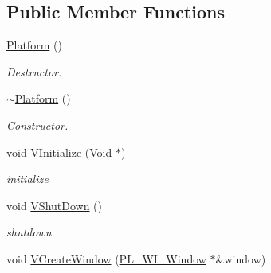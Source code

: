\subsection*{Public Member Functions}
\begin{DoxyCompactItemize}
\item 
\hypertarget{classPlatform_1_1Platform_1_1Linux_1_1Platform_abae694cf43dbc3e53f9f3312ed94dfcc}{
\hyperlink{classPlatform_1_1Platform_1_1Linux_1_1Platform_abae694cf43dbc3e53f9f3312ed94dfcc}{Platform} ()}
\label{classPlatform_1_1Platform_1_1Linux_1_1Platform_abae694cf43dbc3e53f9f3312ed94dfcc}

\begin{DoxyCompactList}\small\item\em Destructor. \item\end{DoxyCompactList}\item 
\hypertarget{classPlatform_1_1Platform_1_1Linux_1_1Platform_a2afa38efdbf00074c5a75e7be42998e5}{
\hyperlink{classPlatform_1_1Platform_1_1Linux_1_1Platform_a2afa38efdbf00074c5a75e7be42998e5}{$\sim$Platform} ()}
\label{classPlatform_1_1Platform_1_1Linux_1_1Platform_a2afa38efdbf00074c5a75e7be42998e5}

\begin{DoxyCompactList}\small\item\em Constructor. \item\end{DoxyCompactList}\item 
\hypertarget{classPlatform_1_1Platform_1_1Linux_1_1Platform_a6004fba24d7a2a4fbc2ac59dfeccd563}{
void \hyperlink{classPlatform_1_1Platform_1_1Linux_1_1Platform_a6004fba24d7a2a4fbc2ac59dfeccd563}{VInitialize} (\hyperlink{structVoid}{Void} $\ast$)}
\label{classPlatform_1_1Platform_1_1Linux_1_1Platform_a6004fba24d7a2a4fbc2ac59dfeccd563}

\begin{DoxyCompactList}\small\item\em initialize \item\end{DoxyCompactList}\item 
\hypertarget{classPlatform_1_1Platform_1_1Linux_1_1Platform_ae94f57dcbbc7deceda8c17db81503481}{
void \hyperlink{classPlatform_1_1Platform_1_1Linux_1_1Platform_ae94f57dcbbc7deceda8c17db81503481}{VShutDown} ()}
\label{classPlatform_1_1Platform_1_1Linux_1_1Platform_ae94f57dcbbc7deceda8c17db81503481}

\begin{DoxyCompactList}\small\item\em shutdown \item\end{DoxyCompactList}\item 
\hypertarget{classPlatform_1_1Platform_1_1Linux_1_1Platform_ae43155fd76d1e33f1cc224b8860c683e}{
void \hyperlink{classPlatform_1_1Platform_1_1Linux_1_1Platform_ae43155fd76d1e33f1cc224b8860c683e}{VCreateWindow} (\hyperlink{classPlatform_1_1Window_1_1Window}{PL\_\-WI\_\-Window} $\ast$\&window)}
\label{classPlatform_1_1Platform_1_1Linux_1_1Platform_ae43155fd76d1e33f1cc224b8860c683e}


\end{DoxyCompactItemize}
